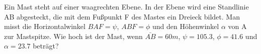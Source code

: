 
Ein Mast steht auf einer waagrechten Ebene. In der Ebene wird eine Standlinie AB abgesteckt,
die mit dem Fußpunkt F des Mastes ein Dreieck bildet. Man misst die
Horizontalwinkel $BAF = \psi$, $ABF = \phi$ und den Höhenwinkel $\alpha$ von A zur Mastspitze.
Wie hoch ist der Mast, wenn $\bar{AB} = 60m$, $\psi = 105.3$, $\phi = 41.6$ und $\alpha = 23.7$
beträgt?
